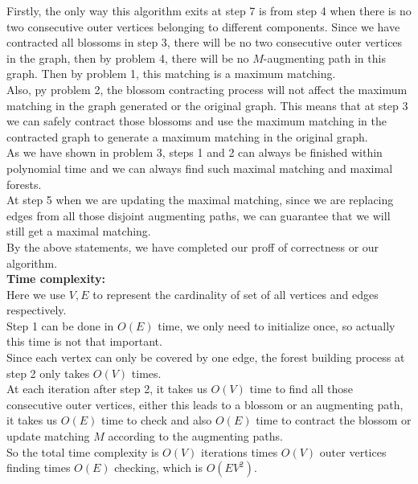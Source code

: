 \documentclass[12pt,letterpaper]{article}
\begin{document}
Firstly, the only way this algorithm exits at step 7 
is from step 4 when there is no two consecutive outer vertices belonging to different components.
Since we have contracted all blossoms in step 3, 
there will be no two consecutive outer vertices in the graph,
then by problem 4,
there will be no $M$-augmenting path in this graph.
Then by problem 1, this matching is a maximum matching.\\
Also, py problem 2, the blossom contracting process will not affect the maximum matching 
in the graph generated or the original graph.
This means that at step 3 we can safely contract those blossoms and 
use the maximum matching in the contracted graph to generate a maximum matching in the original graph.\\
As we have shown in problem 3, 
steps 1 and 2 can always be finished within polynomial time and we can
always find such maximal matching and maximal forests.\\
At step 5 when we are updating the maximal matching,
since we are replacing edges from all those disjoint augmenting paths,
we can guarantee that we will still get a maximal matching.\\
By the above statements, we have completed our proff of correctness or our algorithm.\\
\newline
\textbf{Time complexity:}\\
Here we use $V,E$ to represent the cardinality of set of all vertices and edges respectively.\\
Step 1 can be done in $O(E)$ time, we only need to initialize once,
so actually this time is not that important.\\
Since each vertex can only be covered by one edge,
the forest building process at step 2 only takes $O(V)$ times.\\
At each iteration after step 2, 
it takes us $O(V)$ time to find all those consecutive outer vertices,
either this leads to a blossom or an augmenting path,
it takes us $O(E)$ time to check
and also $O(E)$ time to contract the blossom
or update matching $M$ according to the augmenting paths.\\
So the total time complexity is $O(V)$ iterations times
$O(V)$ outer vertices finding times $O(E)$ checking,
which is $O(EV^2)$.
\end{document}
